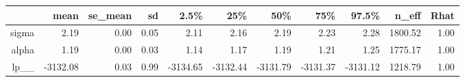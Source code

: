 \begin{table}[ht]
\centering
\begin{tabular}{rrrrrrrrrrr}
  \hline
 & mean & se\_mean & sd & 2.5\% & 25\% & 50\% & 75\% & 97.5\% & n\_eff & Rhat \\ 
  \hline
sigma & 2.19 & 0.00 & 0.05 & 2.11 & 2.16 & 2.19 & 2.23 & 2.28 & 1800.52 & 1.00 \\ 
  alpha & 1.19 & 0.00 & 0.03 & 1.14 & 1.17 & 1.19 & 1.21 & 1.25 & 1775.17 & 1.00 \\ 
  lp\_\_ & -3132.08 & 0.03 & 0.99 & -3134.65 & -3132.44 & -3131.79 & -3131.37 & -3131.12 & 1218.79 & 1.00 \\ 
   \hline
\end{tabular}
\label{zfit_tab}
\end{table}

